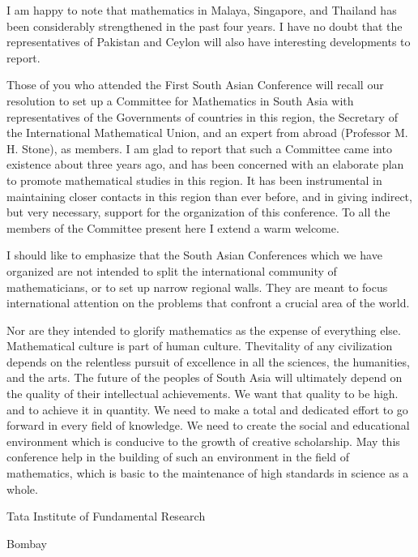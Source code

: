 I am happy to note that mathematics in Malaya, Singapore, and Thailand
has been considerably strengthened in the past four years. I have no
doubt that the representatives of Pakistan and Ceylon will also have
interesting developments to report.

Those of you who attended the First South Asian Conference will recall
our resolution to set up a Committee for Mathematics in South Asia
with representatives of the Governments of countries in this region,
the Secretary of the International Mathematical Union, and an expert
from abroad (Professor M. H. Stone), as  members. I am glad to report
that such a Committee came into existence about three years ago, and
has been concerned with an elaborate plan to promote mathematical
studies in this region. It has been instrumental in maintaining closer
contacts in this region than ever before, and in giving indirect, but
very necessary, support for the organization of this conference. To
all the members of the Committee present here I extend a warm welcome.

I should like to emphasize that the South Asian Conferences which we
have organized are not intended to split the international community
of mathematicians, or to set up narrow regional walls. They are meant
to focus international attention on the problems that confront a
crucial area of the world.

Nor are they intended to glorify mathematics as the expense of
everything else. Mathematical culture is part of human culture.
The\pageoriginale vitality of any civilization depends on the relentless pursuit of
excellence in all the sciences, the humanities, and the arts. The
future of the peoples of South Asia will ultimately depend on the
quality of their intellectual achievements. We want that quality to be
high. and to achieve it in quantity. We need to make a total and
dedicated effort to go forward in every field of knowledge. We need to
create the social and educational environment which is conducive to
the growth of creative scholarship. May this conference help in the
building of such an environment in the  field of mathematics, which is
basic to the maintenance of high standards in science as a whole.

\bigskip

\bigskip

{\fontsize{9pt}{11pt}\selectfont
Tata Institute of Fundamental Research

Bombay}\relax

